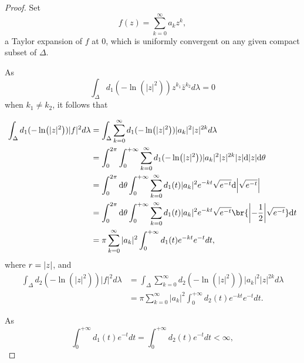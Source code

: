 \documentclass[twoside,openany,12pt]{beautynote}
\begin{document}
\begin{proof}
  Set
$$f(z)=\sum_{k=0}^{\infty}a_{k}z^{k},$$
a Taylor expansion of $f$ at $0$,
which is uniformly convergent on any given compact subset of
$\Delta$.

As
$$\int_{\Delta}d_{1}(-\ln(|z|^{2}))z^{k_{1}}\bar{z}^{k_{2}}d\lambda=0$$
when $k_{1}\neq k_{2}$, it follows that

\begin{equation}
  \label{equ:polar.0919.1.a}
  \begin{split}
    \int_{\Delta}d_{1}(-\ln(|z|^{2}))|f|^{2}d\lambda
    &=\int_{\Delta}\sum_{k=0}^{\infty}d_{1}(-\ln(|z|^{2}))|a_{k}|^{2}|z|^{2k}d\lambda
    \\
    &=\int_{0}^{2\pi}\int_{0}^{+\infty}\sum_{k=0}^{\infty}d_{1}(-\ln(|z|^{2}))|a_{k}|^{2}|z|^{2k} \abs{z}\dd \abs{z} \dd \theta\\
    &=\int_{0}^{2\pi}\dd \theta\int_{0}^{+\infty}\sum_{k=0}^{\infty}d_{1}(t)|a_{k}|^{2}e^{-kt}\sqrt{e^{-t}}\dd \abs{\sqrt{e^{-t}}}\\ 
    &=\int_{0}^{2\pi}\dd \theta\int_{0}^{+\infty}\sum_{k=0}^{\infty}d_{1}(t)|a_{k}|^{2}e^{-kt}\sqrt{e^{-t}} \br{\abs{-\frac 12}\sqrt{e^{-t}}}\dd t\\ 
    &=\pi\sum_{k=0}^{\infty}|a_{k}|^{2}\int_{0}^{+\infty}d_{1}(t)e^{-kt}e^{-t}dt,
  \end{split}
\end{equation}
where $r=\abs{z}$,
and
\begin{equation}
\label{equ:polar.0919.2.a}
\begin{split}
\int_{\Delta}d_{2}(-\ln(|z|^{2}))|f|^{2}d\lambda
&=\int_{\Delta}\sum_{k=0}^{\infty}d_{2}(-\ln(|z|^{2}))|a_{k}|^{2}|z|^{2k}d\lambda
\\&=\pi\sum_{k=0}^{\infty}|a_{k}|^{2}\int_{0}^{+\infty}d_{2}(t)e^{-kt}e^{-t}dt.
\end{split}
\end{equation}

As
$$\int_{0}^{+\infty}d_{1}(t)e^{-t}dt=\int_{0}^{+\infty}d_{2}(t)e^{-t}dt<\infty,$$


\end{proof}
\end{document}
